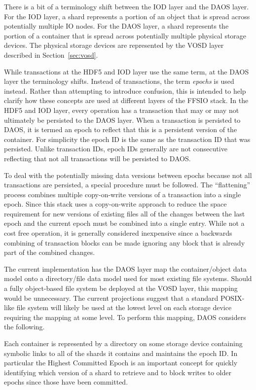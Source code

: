 \documentclass[conference]{IEEEtran} \pdfpagewidth=8.5in
\begin{document}
There is a bit of a terminology shift between the IOD layer and the DAOS
layer. For the IOD layer, a shard represents a portion of an object that is
spread across potentially multiple IO nodes. For the DAOS layer, a shard
represents the portion of a container that is spread across potentially
multiple physical storage devices.  The physical storage devices are
represented by the VOSD layer described in Section~\ref{sec:vosd}.

While transactions at the HDF5 and IOD layer use the same term, at the DAOS
layer the terminology shifts. Instead of transactions, the term {\em epochs}
is used instead. Rather than attempting to introduce confusion, this is intended
to help clarify how these concepts are used at different layers of the FFSIO
stack. In the HDF5 and IOD layer, every operation has a transaction that may
or may not ultimately be persisted to the DAOS layer. When a transaction is
persisted to DAOS, it is termed an epoch to reflect that this is a persistent
version of the container. For simplicity the epoch ID is the same as the
transaction ID that was persisted. Unlike transaction IDs, epoch IDs generally
are not consecutive reflecting that not all transactions will be persisted to
DAOS.

To deal with the potentially missing data versions between epochs because not
all transactions are persisted, a special procedure must be followed. The
``flattening'' process combines multiple copy-on-write versions of a
transaction into a single epoch.  Since this stack uses a copy-on-write
approach to reduce the space requirement for new versions of existing files all
of the changes between the last epoch and the current epoch must be combined
into a single entry. While not a cost free operation, it is generally
considered inexpensive since a backwards combining of transaction blocks can
be made ignoring any block that is already part of the combined changes.

The current implementation has the DAOS layer map the container/object data
model onto a directory/file data model used for most existing file systems.
Should a fully object-based file system be deployed at the VOSD layer, this
mapping would be unnecessary. The current projections suggest that a standard
POSIX-like file system will likely be used at the lowest level on each storage
device requiring the mapping at some level. To perform this mapping, DAOS
considers the following.

Each container is represented by a directory on some storage device containing
symbolic links to all of the shards it contains and maintains the epoch ID.
In particular the Highest Committed Epoch is an important concept for
quickly identifying which version of a shard to retrieve and to block writes to
older epochs since those have been committed.
\end{document}
